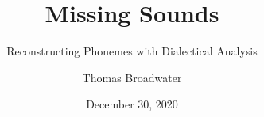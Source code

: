 
\title{Missing Sounds}
\subtitle{Reconstructing Phonemes with Dialectical Analysis}
\author{Thomas Broadwater}
\date{December 30, 2020}
